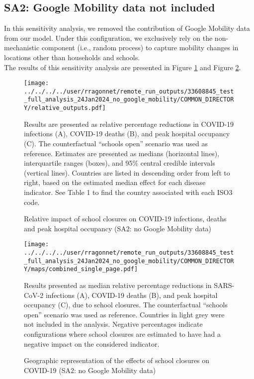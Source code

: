 \subsection{SA2: Google Mobility data not included}

In this sensitivity analysis, we removed the contribution of Google Mobility data from our model.  
Under this configuration, we exclusively rely on the non-mechanistic component (i.e., random process) to capture 
mobility changes in locations other than households and schools.
\\

The results of this sensitivity analysis are presented in Figure \ref{fig:SA2_rel_outputs} and Figure \ref{fig:SA2_maps}.

\begin{figure}[!ht]
    \begin{center}
    \texttt{[image: ../../../../user/rragonnet/remote\_run\_outputs/33608845\_test\_full\_analysis\_24Jan2024\_no\_google\_mobility/COMMON\_DIRECTORY/relative\_outputs.pdf]}
    \end{center}
    \caption{Relative impact of school closures on COVID-19 infections, deaths and peak hospital occupancy (SA2: no Google Mobility data)} 
    Results are presented as relative percentage reductions in COVID-19 infections (A), 
    COVID-19 deaths (B), and peak hospital occupancy (C). The counterfactual ``schools open'' scenario was used as reference. 
    Estimates are presented as medians (horizontal lines), interquartile ranges (boxes), and 95\% central credible intervals (vertical lines). 
    Countries are listed in descending order from left to right, based on the estimated median effect for each disease indicator. See Table 1 to find the country associated with each ISO3 code. 
    \label{fig:SA2_rel_outputs}
\end{figure}

\begin{figure}[!ht]
    \begin{center}
    \texttt{[image: ../../../../user/rragonnet/remote\_run\_outputs/33608845\_test\_full\_analysis\_24Jan2024\_no\_google\_mobility/COMMON\_DIRECTORY/maps/combined\_single\_page.pdf]}
    \end{center}
    \caption{Geographic representation of the effects of school closures on COVID-19 (SA2: no Google Mobility data)} 
    Results presented as median relative percentage reductions in SARS-CoV-2 infections (A), COVID-19 deaths (B), and peak hospital occupancy (C), due to school closures. The counterfactual “schools open” scenario was used as reference. Countries in light grey were not included in the analysis. Negative percentages indicate configurations where school closures are estimated to have had a negative impact on the considered indicator.
    \label{fig:SA2_maps}
\end{figure}




